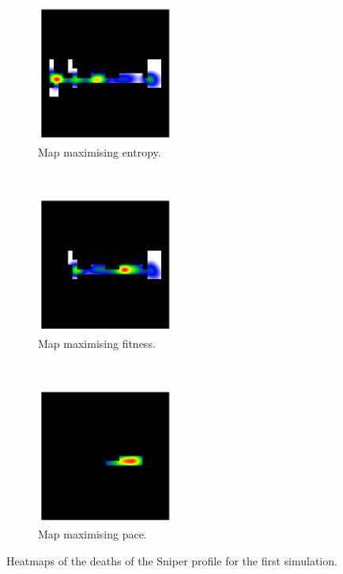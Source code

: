 \begin{figure}[H]
    \centering
    \begin{subfigure}[t]{0.3\textwidth}
        \centering
        \includegraphics[height=4.5cm]{Images/images/experiment_one/best_entropy_pop_0/deaths_bot_1.png}
        \caption{Map maximising entropy.}
    \end{subfigure}%
    ~ 
    \begin{subfigure}[t]{0.3\textwidth}
        \centering
        \includegraphics[height=4.5cm]{Images/images/experiment_one/best_fitness_pop_0/deaths_bot_1.png}
        \caption{Map maximising fitness.}
    \end{subfigure}
    ~ 
    \begin{subfigure}[t]{0.3\textwidth}
        \centering
        \includegraphics[height=4.5cm]{Images/images/experiment_one/best_pace_pop_0/deaths_bot_1.png}
        \caption{Map maximising pace.}
    \end{subfigure}
    \caption{Heatmaps of the deaths of the Sniper profile for the first simulation.}
\end{figure}
